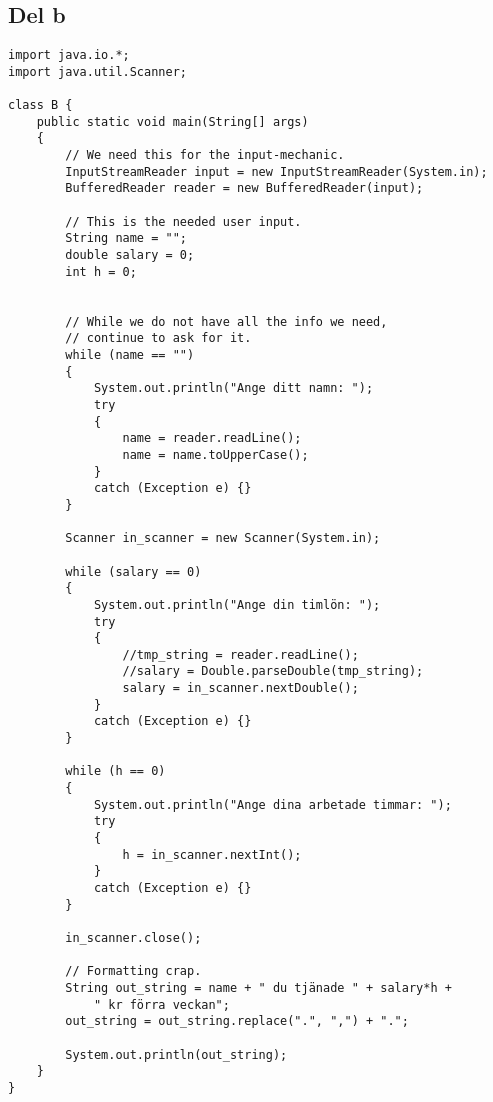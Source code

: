 \documentclass[a4paper,12pt]{article}
\begin{document}
\subsection{\textsf{Del b}}
\begin{verbatim}
import java.io.*;
import java.util.Scanner;

class B {
    public static void main(String[] args) 
    {
        // We need this for the input-mechanic.
        InputStreamReader input = new InputStreamReader(System.in);
        BufferedReader reader = new BufferedReader(input);

        // This is the needed user input.
        String name = "";
        double salary = 0;
        int h = 0;


        // While we do not have all the info we need,
        // continue to ask for it.
        while (name == "")
        {
            System.out.println("Ange ditt namn: ");
            try
            {
                name = reader.readLine();
                name = name.toUpperCase();
            }
            catch (Exception e) {}
        }

        Scanner in_scanner = new Scanner(System.in);

        while (salary == 0)
        {
            System.out.println("Ange din timlön: ");
            try
            {
                //tmp_string = reader.readLine();
                //salary = Double.parseDouble(tmp_string);
                salary = in_scanner.nextDouble();
            }
            catch (Exception e) {}
        }

        while (h == 0)
        {
            System.out.println("Ange dina arbetade timmar: ");
            try
            {
                h = in_scanner.nextInt();
            }
            catch (Exception e) {}
        }

        in_scanner.close();

        // Formatting crap.
        String out_string = name + " du tjänade " + salary*h + 
            " kr förra veckan";
        out_string = out_string.replace(".", ",") + ".";

        System.out.println(out_string);
    }
}
\end{verbatim}


\newpage
\end{document}
